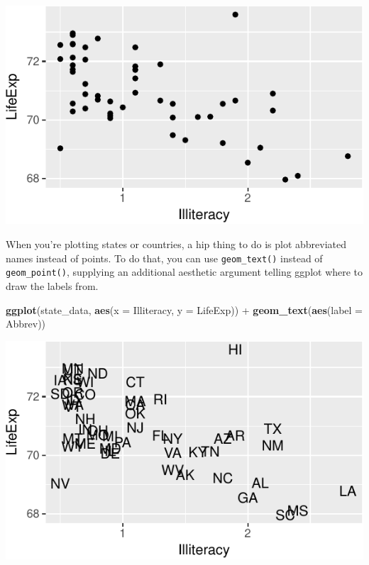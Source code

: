 \documentclass[12pt,oneside,openany]{book}
\newenvironment{Shaded}{\begin{snugshade}}{\end{snugshade}}
\newcommand{\KeywordTok}[1]{\textcolor[rgb]{0.13,0.29,0.53}{\textbf{{#1}}}}
\newcommand{\DataTypeTok}[1]{\textcolor[rgb]{0.13,0.29,0.53}{{#1}}}
\newcommand{\StringTok}[1]{\textcolor[rgb]{0.31,0.60,0.02}{{#1}}}
\newcommand{\NormalTok}[1]{{#1}}
\begin{document}
\includegraphics{pdaps_files/figure-latex/scatter-1.pdf}

When you're plotting states or countries, a hip thing to do is plot
abbreviated names instead of points. To do that, you can use
\texttt{geom\_text()} instead of \texttt{geom\_point()}, supplying an
additional aesthetic argument telling ggplot where to draw the labels
from.

\begin{Shaded}
\begin{Highlighting}[]
\KeywordTok{ggplot}\NormalTok{(state_data, }\KeywordTok{aes}\NormalTok{(}\DataTypeTok{x =} \NormalTok{Illiteracy, }\DataTypeTok{y =} \NormalTok{LifeExp)) +}
\StringTok{  }\KeywordTok{geom_text}\NormalTok{(}\KeywordTok{aes}\NormalTok{(}\DataTypeTok{label =} \NormalTok{Abbrev))}
\end{Highlighting}
\end{Shaded}

\includegraphics{pdaps_files/figure-latex/scatter-text-1.pdf}
\end{document}
